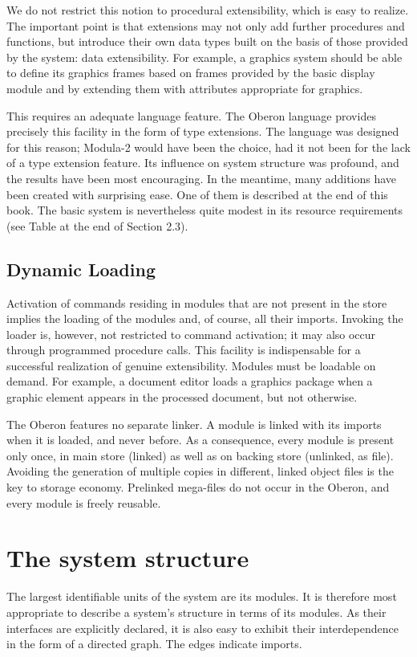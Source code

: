 We do not restrict this notion to procedural extensibility, which is easy to realize. The important
point is that extensions may not only add further procedures and functions, but introduce their own
data types built on the basis of those provided by the system: data extensibility. For example, a
graphics system should be able to define its graphics frames based on frames provided by the
basic display module and by extending them with attributes appropriate for graphics.

This requires an adequate language feature. The Oberon language provides precisely this facility in
the form of type extensions. The language was designed for this reason; Modula-2 would have
been the choice, had it not been for the lack of a type extension feature. Its influence on system
structure was profound, and the results have been most encouraging. In the meantime, many
additions have been created with surprising ease. One of them is described at the end of this book.
The basic system is nevertheless quite modest in its resource requirements (see Table at the end of Section 2.3).

\subsection{Dynamic Loading}
Activation of commands residing in modules that are not present in the store implies the loading of
the modules and, of course, all their imports. Invoking the loader is, however, not restricted to
command activation; it may also occur through programmed procedure calls. This facility is
indispensable for a successful realization of genuine extensibility. Modules must be loadable on
demand. For example, a document editor loads a graphics package when a graphic element
appears in the processed document, but not otherwise.

The Oberon features no separate linker. A module is linked with its imports when it is
loaded, and never before. As a consequence, every module is present only once, in main store
(linked) as well as on backing store (unlinked, as file). Avoiding the generation of multiple copies in
different, linked object files is the key to storage economy. Prelinked mega-files do not occur in the
Oberon, and every module is freely reusable.

\section{The system structure}
The largest identifiable units of the system are its modules. It is therefore most appropriate to
describe a system's structure in terms of its modules. As their interfaces are explicitly declared, it is
also easy to exhibit their interdependence in the form of a directed graph. The edges indicate
imports.

